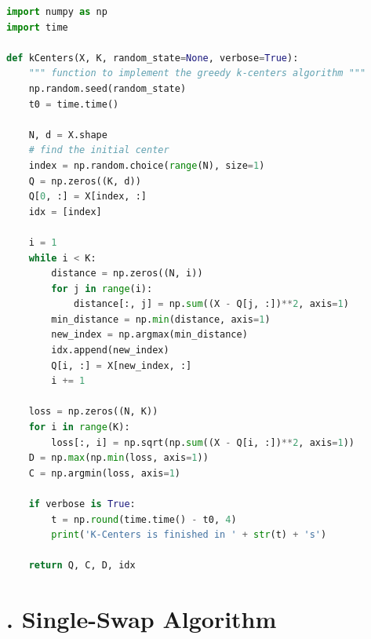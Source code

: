 \begin{lstlisting}[language=Python, caption=K-Centers Algorithm Python Code]
import numpy as np
import time

def kCenters(X, K, random_state=None, verbose=True):
    """ function to implement the greedy k-centers algorithm """
    np.random.seed(random_state)
    t0 = time.time()

    N, d = X.shape
    # find the initial center
    index = np.random.choice(range(N), size=1)
    Q = np.zeros((K, d))
    Q[0, :] = X[index, :]
    idx = [index]

    i = 1
    while i < K:
        distance = np.zeros((N, i))
        for j in range(i):
            distance[:, j] = np.sum((X - Q[j, :])**2, axis=1)
        min_distance = np.min(distance, axis=1)
        new_index = np.argmax(min_distance)
        idx.append(new_index)
        Q[i, :] = X[new_index, :]
        i += 1

    loss = np.zeros((N, K))
    for i in range(K):
        loss[:, i] = np.sqrt(np.sum((X - Q[i, :])**2, axis=1))
    D = np.max(np.min(loss, axis=1))
    C = np.argmin(loss, axis=1)

    if verbose is True:
        t = np.round(time.time() - t0, 4)
        print('K-Centers is finished in ' + str(t) + 's')

    return Q, C, D, idx
\end{lstlisting}

\section*{\Large {}. Single-Swap Algorithm}

